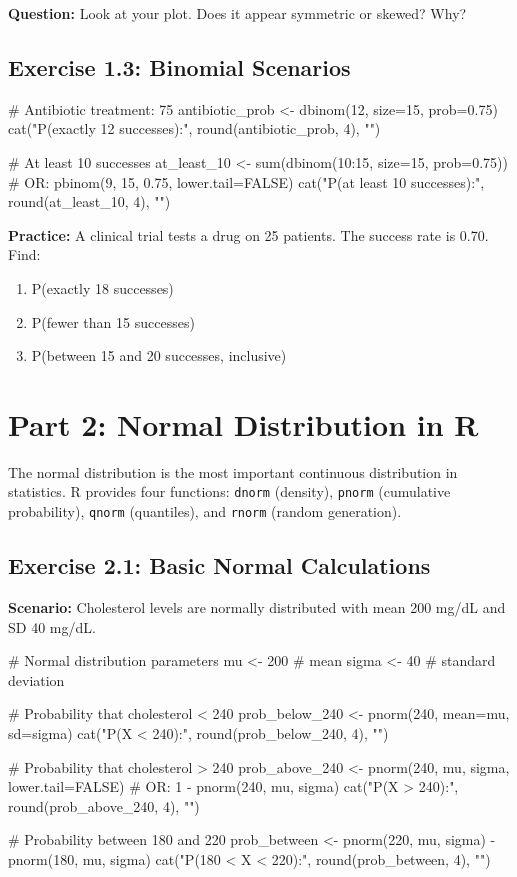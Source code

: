 \documentclass[11pt]{article}
\begin{document}
\textbf{Question:} Look at your plot. Does it appear symmetric or skewed? Why?

\vspace{1.5cm}

\subsection{Exercise 1.3: Binomial Scenarios}

\begin{rcode}
# Antibiotic treatment: 75%
antibiotic_prob <- dbinom(12, size=15, prob=0.75)
cat("P(exactly 12 successes):", round(antibiotic_prob, 4), "\n")

# At least 10 successes
at_least_10 <- sum(dbinom(10:15, size=15, prob=0.75))
# OR: pbinom(9, 15, 0.75, lower.tail=FALSE)
cat("P(at least 10 successes):", round(at_least_10, 4), "\n")
\end{rcode}

\textbf{Practice:} A clinical trial tests a drug on 25 patients. The success rate is 0.70. Find:
\begin{enumerate}[label=\alph*)]
\item P(exactly 18 successes)
\item P(fewer than 15 successes)
\item P(between 15 and 20 successes, inclusive)
\end{enumerate}

\vspace{2cm}

\section{Part 2: Normal Distribution in R}

The normal distribution is the most important continuous distribution in statistics. R provides four functions: \texttt{dnorm} (density), \texttt{pnorm} (cumulative probability), \texttt{qnorm} (quantiles), and \texttt{rnorm} (random generation).

\subsection{Exercise 2.1: Basic Normal Calculations}

\textbf{Scenario:} Cholesterol levels are normally distributed with mean 200 mg/dL and SD 40 mg/dL.

\begin{rcode}
# Normal distribution parameters
mu <- 200      # mean
sigma <- 40    # standard deviation

# Probability that cholesterol < 240
prob_below_240 <- pnorm(240, mean=mu, sd=sigma)
cat("P(X < 240):", round(prob_below_240, 4), "\n")

# Probability that cholesterol > 240
prob_above_240 <- pnorm(240, mu, sigma, lower.tail=FALSE)
# OR: 1 - pnorm(240, mu, sigma)
cat("P(X > 240):", round(prob_above_240, 4), "\n")

# Probability between 180 and 220
prob_between <- pnorm(220, mu, sigma) - pnorm(180, mu, sigma)
cat("P(180 < X < 220):", round(prob_between, 4), "\n")
\end{rcode}
\end{document}
